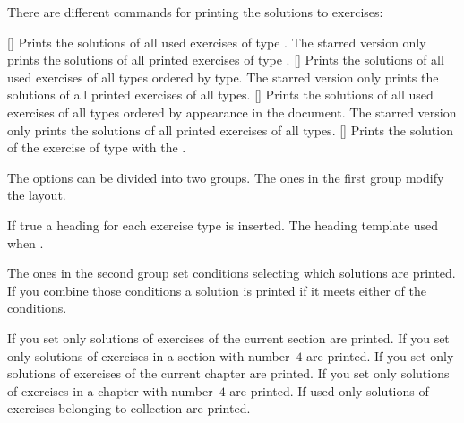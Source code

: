 \documentclass{xsim-manual}
\begin{document}
There are different commands for printing the solutions to exercises:
\begin{commands}
  [\sarg{}]
    Prints the solutions of all used exercises of type .
    The starred version only prints the solutions of all printed exercises of
    type .
  [\sarg{}]
    Prints the solutions of all used exercises of all types ordered by type.
    The starred version only prints the solutions of all printed exercises of
    all types.
  [\sarg{}]
    Prints the solutions of all used exercises of all types ordered by
    appearance in the document.  The starred version only prints the solutions
    of all printed exercises of all types.
  []
    Prints the solution of the exercise of type  with the
     .
\end{commands}

\begin{example}
\end{example}

The options can be divided into two groups.  The ones in the first group
modify the layout.
\begin{options}
    If true a heading for each exercise type is inserted.
    The heading template used when .
\end{options}

The ones in the second group set conditions selecting which solutions are
printed.  If you combine those conditions a solution is printed if it meets
either of the conditions.
\begin{options}
    If you set  only solutions of exercises of the
    current section are printed.  If you set  only solutions
    of exercises in a section with number~$4$ are printed.
    If you set  only solutions of exercises of the
    current chapter are printed.  If you set  only solutions
    of exercises in a chapter with number~$4$ are printed.
    If used only solutions of exercises belonging to collection
     are printed.
\end{options}
\end{document}
